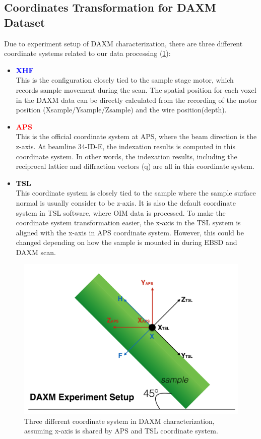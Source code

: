 \documentclass[12pt]{scrartcl}
\begin{document}
\subsection{Coordinates Transformation for DAXM Dataset}
\label{sec:coord}
Due to experiment setup of DAXM characterization, there are three different coordinate systems related to our data processing (\cref{fig:daxmcoord}):
\begin{itemize}
\item \textcolor{blue}{\textbf{XHF}} \\
This is the configuration closely tied to the sample stage motor, which records sample movement during the scan.
The spatial position for each voxel in the DAXM data can be directly calculated from the recording of the motor position (Xsample/Ysample/Zsample) and the wire position(depth).

\item \textcolor{red}{\textbf{APS}} \\
This is the official coordinate system at APS, where the beam direction is the z-axis.
At beamline 34-ID-E, the indexation results is computed in this coordinate system.
In other words, the indexation results, including the reciprocal lattice and diffraction vectors (\tnsr q) are all in this coordinate system.

\item \textcolor{black}{\textbf{TSL}} \\
This coordinate system is closely tied to the sample where the sample surface normal is usually consider to be z-axis.
It is also the default coordinate system in TSL software, where OIM data is processed.
To make the coordinate system transformation easier, the x-axis in the TSL system is aligned with the x-axis in APS coordinate system.
However, this could be changed depending on how the sample is mounted in during EBSD and DAXM scan.

\end{itemize}

\begin{figure}[htp]
\centering
\includegraphics[width=.7\linewidth]{daxmcoord.png}
\caption{Three different coordinate system in DAXM characterization, assuming x-axis is shared by APS and TSL coordinate system.}
\label{fig:daxmcoord}
\end{figure}
\end{document}

